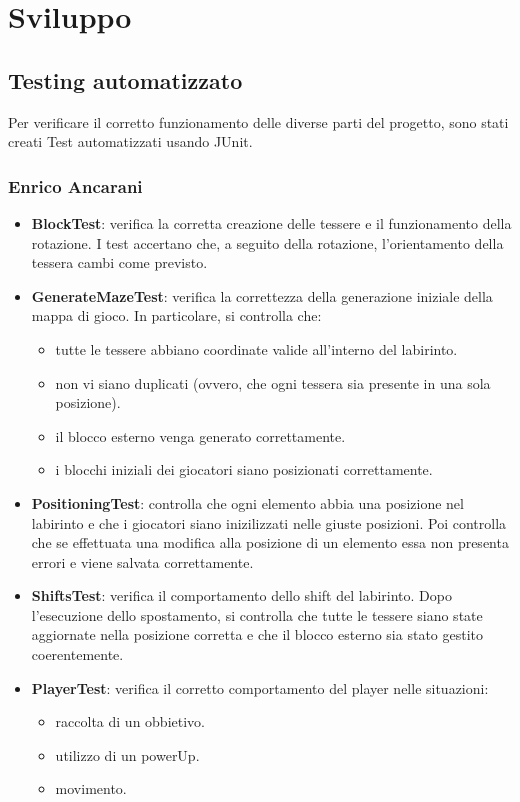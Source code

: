 \documentclass[a4paper,12pt]{report}
\begin{document}
\chapter{Sviluppo}
\section{Testing automatizzato}

Per verificare il corretto funzionamento delle diverse parti del progetto, sono
 stati creati Test automatizzati usando JUnit.

\subsection{Enrico Ancarani}
\begin{itemize}
	\item \textbf{BlockTest}: verifica la corretta creazione delle tessere e il funzionamento della rotazione. I test accertano che, a seguito della rotazione, 
	l’orientamento della tessera cambi come previsto.
	\item \textbf{GenerateMazeTest}: verifica la correttezza della generazione iniziale della mappa di gioco. In particolare, si controlla che:
	\begin{itemize}
		\item tutte le tessere abbiano coordinate valide all’interno del labirinto.
		\item non vi siano duplicati (ovvero, che ogni tessera sia presente in una sola posizione).
		\item il blocco esterno venga generato correttamente.
		\item i blocchi iniziali dei giocatori siano posizionati correttamente.
	\end{itemize}
	\item \textbf{PositioningTest}: controlla che ogni elemento abbia una posizione nel labirinto e che i giocatori siano inizilizzati nelle giuste posizioni.
	Poi controlla che se effettuata una modifica alla posizione di un elemento essa non presenta errori e viene salvata correttamente.
	\item \textbf{ShiftsTest}: verifica il comportamento dello shift del labirinto. Dopo l’esecuzione dello spostamento, si controlla che 
	tutte le tessere siano state aggiornate nella posizione corretta e che il blocco esterno sia stato gestito coerentemente.
	\item \textbf{PlayerTest}: verifica il corretto comportamento del player nelle situazioni:
	\begin{itemize}
		\item raccolta di un obbietivo.
		\item utilizzo di un powerUp.
		\item movimento.
	\end{itemize}
\end{itemize}
\end{document}

